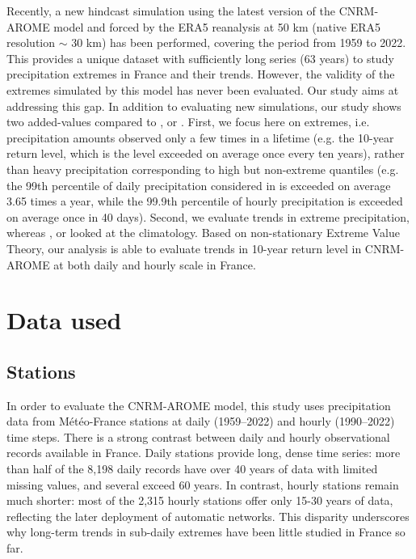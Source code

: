 \documentclass[hess, manuscript]{copernicus}
\begin{document}
Recently, a new hindcast simulation using the latest version of the CNRM-AROME model and forced by the ERA5 reanalysis at 50 km (native ERA5 resolution $\sim$ 30 km) has been performed, covering the period from 1959 to 2022. This provides a unique dataset with sufficiently long series (63 years) to study precipitation extremes in France and their trends. However, the validity of the extremes simulated by this model has never been evaluated. Our study
aims at addressing this gap. 
 In addition to evaluating new simulations, our study shows two added-values compared to \cite{Caillaud2021}, \cite{ban-etal-2021} or \cite{pichelli-etal-2021}. First, we focus here on extremes, i.e. precipitation amounts observed only a few times in a lifetime (e.g. the 10-year return level, which is the level exceeded on average once every ten years), rather than heavy precipitation corresponding to high but non-extreme quantiles (e.g. the 99th percentile of daily precipitation considered in \cite{ban-etal-2021} is exceeded on average 3.65 times a year, while the 99.9th percentile of hourly precipitation is exceeded on average once in 40 days). Second, we evaluate trends in extreme precipitation, whereas \cite{Caillaud2021}, \cite{ban-etal-2021} or \cite{pichelli-etal-2021}  looked at the climatology. Based on non-stationary Extreme Value Theory, our analysis is able to evaluate trends in 10-year return level in CNRM-AROME at both daily and hourly scale in France.


\section{Data used}\label{data-used}

\subsection{Stations}\label{stations}

In order to evaluate the CNRM-AROME model, this study uses precipitation data from Météo-France stations
\citep{meteofrance2024} at daily (1959--2022) and hourly (1990--2022) time
steps. There is a strong contrast between daily and hourly observational records available in France. Daily stations provide long, dense time series: more than half of the 8,198 daily records have over 40 years of data with limited missing values, and several exceed 60 years. In contrast, hourly stations remain much shorter: most of the 2,315 hourly stations offer only 15-30 years of data, reflecting the later deployment of automatic networks. This disparity underscores why long-term trends in sub-daily extremes have been little studied in France so far.  
\end{document}
